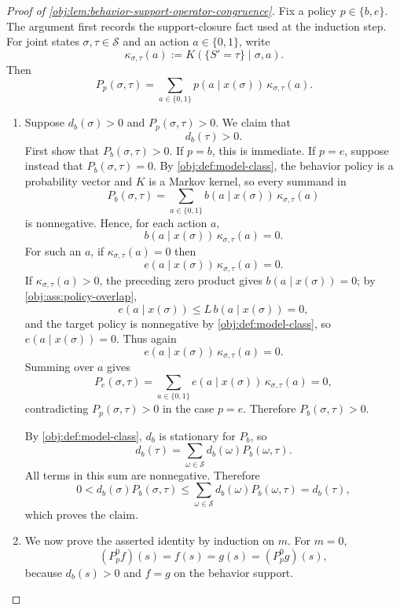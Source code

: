 \documentclass[11pt]{article}
\begin{document}
\begin{proof}[Proof of \cref{obj:lem:behavior-support-operator-congruence}]
Fix a policy \(p\in\{b,e\}\).  The argument first records the support-closure fact used at the induction step.  For joint states \(\sigma,\tau\in\mathcal S\) and an action \(a\in\{0,1\}\), write
\[
\kappa_{\sigma,\tau}(a)
:=
K(\{S'=\tau\}\mid \sigma,a).
\]
Then
\[
P_p(\sigma,\tau)
=
\sum_{a\in\{0,1\}}p(a\mid x(\sigma))\,\kappa_{\sigma,\tau}(a).
\]

\begin{enumerate}
\item Suppose \(d_b(\sigma)>0\) and \(P_p(\sigma,\tau)>0\).  We claim that
\[
d_b(\tau)>0 .
\]
First show that \(P_b(\sigma,\tau)>0\).  If \(p=b\), this is immediate.  If \(p=e\), suppose instead that \(P_b(\sigma,\tau)=0\).  By \cref{obj:def:model-class}, the behavior policy is a probability vector and \(K\) is a Markov kernel, so every summand in
\[
P_b(\sigma,\tau)
=
\sum_{a\in\{0,1\}} b(a\mid x(\sigma))\,\kappa_{\sigma,\tau}(a)
\]
is nonnegative.  Hence, for each action \(a\),
\[
b(a\mid x(\sigma))\,\kappa_{\sigma,\tau}(a)=0 .
\]
For such an \(a\), if \(\kappa_{\sigma,\tau}(a)=0\) then
\[
e(a\mid x(\sigma))\,\kappa_{\sigma,\tau}(a)=0.
\]
If \(\kappa_{\sigma,\tau}(a)>0\), the preceding zero product gives \(b(a\mid x(\sigma))=0\); by \cref{obj:ass:policy-overlap},
\[
e(a\mid x(\sigma))
\le
L\,b(a\mid x(\sigma))
=
0,
\]
and the target policy is nonnegative by \cref{obj:def:model-class}, so \(e(a\mid x(\sigma))=0\).  Thus again
\[
e(a\mid x(\sigma))\,\kappa_{\sigma,\tau}(a)=0 .
\]
Summing over \(a\) gives
\[
P_e(\sigma,\tau)
=
\sum_{a\in\{0,1\}}e(a\mid x(\sigma))\,\kappa_{\sigma,\tau}(a)
=
0,
\]
contradicting \(P_p(\sigma,\tau)>0\) in the case \(p=e\).  Therefore \(P_b(\sigma,\tau)>0\).

By \cref{obj:def:model-class}, \(d_b\) is stationary for \(P_b\), so
\[
d_b(\tau)
=
\sum_{\omega\in\mathcal S} d_b(\omega)P_b(\omega,\tau).
\]
All terms in this sum are nonnegative.  Therefore
\[
0
<
d_b(\sigma)P_b(\sigma,\tau)
\le
\sum_{\omega\in\mathcal S} d_b(\omega)P_b(\omega,\tau)
=
d_b(\tau),
\]
which proves the claim. %

\item We now prove the asserted identity by induction on \(m\).  For \(m=0\),
\[
(P_p^0f)(s)=f(s)=g(s)=(P_p^0g)(s),
\]
because \(d_b(s)>0\) and \(f=g\) on the behavior support.


\end{enumerate}
\end{proof}
\end{document}
